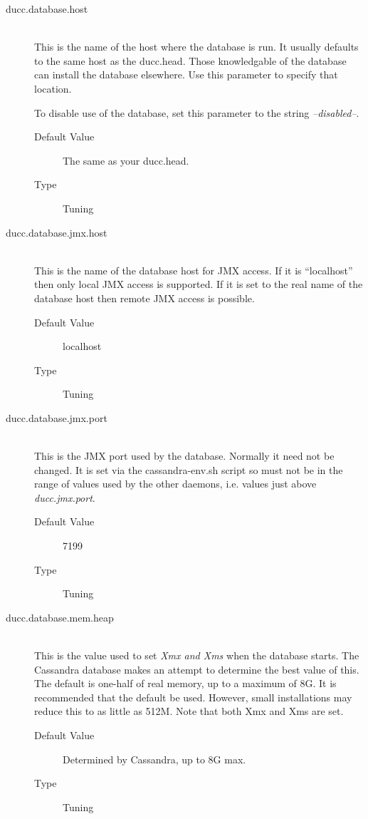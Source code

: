     \begin{description}

      \item[ducc.database.host] \hfill \\
        This is the name of the host where the database is run.  It usually defaults to the
        same host as the ducc.head.  Those knowledgable of the database can install the 
        database elsewhere.  Use this parameter to specify that location.

        To disable use of the database, set this parameter to the string {\em --disabled--}.
        \begin{description}
          \item[Default Value] The same as your ducc.head.
          \item[Type] Tuning
        \end{description} 

      \item[ducc.database.jmx.host] \hfill \\
        This is the name of the database host for JMX access.  If it is ``localhost'' then only local
        JMX access is supported.  If it is set to the real name of the database host then remote JMX
        access is possible.
        \begin{description}
          \item[Default Value] localhost
          \item[Type] Tuning
        \end{description} 

      \item[ducc.database.jmx.port] \hfill \\
        This is the JMX port used by the database.  Normally it need not be changed. 
        It is set via the cassandra-env.sh script so must not be in the range of values used by the
        other daemons, i.e. values just above {\em ducc.jmx.port}.
        \begin{description}
          \item[Default Value] 7199
          \item[Type] Tuning
        \end{description} 

      \item[ducc.database.mem.heap] \hfill \\
        This is the value used to set {\em Xmx and Xms} when the database starts.  The
        Cassandra database makes an attempt to determine the best value of this.  The
        default is one-half of real memory, up to a maximum of 8G.  It is recommended that
        the default be used.  However, small installations may reduce this to as little
        as 512M.  Note that both Xmx and Xms are set.
        \begin{description}
          \item[Default Value] Determined by Cassandra, up to 8G max.
          \item[Type] Tuning
        \end{description} 


\end{description}
